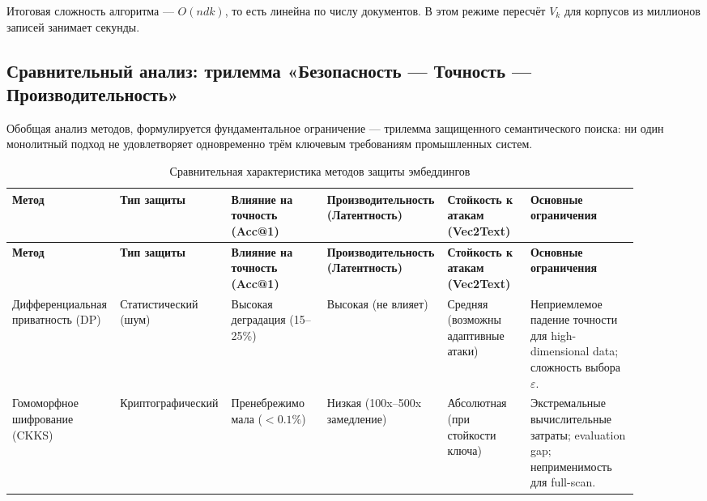 \documentclass[a4paper, 12pt, oneside, openany]{article}
\begin{document}
Итоговая сложность алгоритма — $O(ndk)$, то есть линейна по числу документов. В этом режиме пересчёт $V_k$ для корпусов из миллионов записей занимает секунды.

\subsection{Сравнительный анализ: трилемма «Безопасность --- Точность --- Производительность»}

Обобщая анализ методов, формулируется фундаментальное ограничение --- трилемма защищенного семантического поиска: ни один монолитный подход не удовлетворяет одновременно трём ключевым требованиям промышленных систем.

\begingroup\footnotesize\setlength{\tabcolsep}{3pt}\setlength{\emergencystretch}{5em}
\begin{longtable}{@{}
		>{\raggedright\arraybackslash}p{0.16\linewidth}
		>{\raggedright\arraybackslash}p{0.14\linewidth}
		>{\raggedright\arraybackslash}p{0.15\linewidth}
		>{\raggedright\arraybackslash}p{0.15\linewidth}
		>{\raggedright\arraybackslash}p{0.13\linewidth}
		>{\raggedright\arraybackslash}p{0.17\linewidth}
		@{}}
	\caption{Сравнительная характеристика методов защиты эмбеддингов}\label{tab:2-1}\\*
	\toprule
	\textbf{Метод} &
	\textbf{Тип защиты} &
	\textbf{Вли\-я\-ние на точ\-ность (Acc@1)} &
	\textbf{Про\-из\-во\-ди\-тель\-ность (Ла\-тент\-ность)} &
	\textbf{Стойкость к атакам (Vec2Text)} &
	\textbf{Основные ограничения} \\
	\midrule
	\endfirsthead
	
	\toprule
	\textbf{Метод} &
	\textbf{Тип защиты} &
	\textbf{Вли\-я\-ние на точ\-ность (Acc@1)} &
	\textbf{Про\-из\-во\-ди\-тель\-ность (Ла\-тент\-ность)} &
	\textbf{Стойкость к атакам (Vec2Text)} &
	\textbf{Основные ограничения} \\
	\midrule
	\endhead
	
	\bottomrule
	\endfoot
	
	\bottomrule
	\endlastfoot
	
	Диф\-фе\-рен\-ци\-аль\-ная при\-ват\-ность (DP) &
	Ста\-тис\-ти\-чес\-кий (шум) &
	Высокая деградация (15--25\%) &
	Высокая (не влияет) &
	Средняя (возможны адаптивные атаки) &
	Неприемлемое падение точности для high-dimensional data; сложность выбора $\varepsilon$. \\
	
	Го\-мо\-морф\-ное шиф\-ро\-ва\-ние (CKKS) &
	Кри\-пто\-гра\-фи\-чес\-кий &
	Пренебрежимо мала ($< 0.1\%$) &
	Низкая (100x--500x замедление) &
	Абсолютная (при стойкости ключа) &
	Экс\-тре\-маль\-ные вы\-чис\-ли\-тель\-ные за\-тра\-ты; evaluation gap; неприменимость для full-scan. \\
	

\end{longtable}
\end{document}
